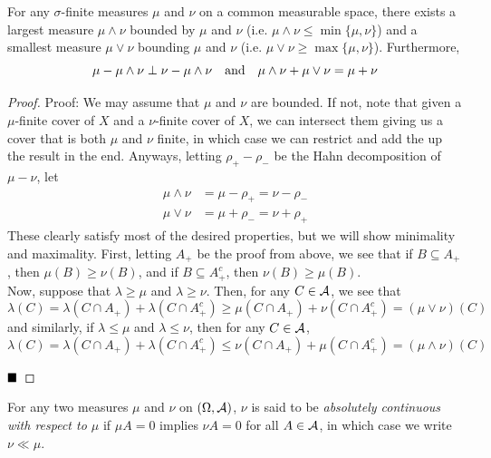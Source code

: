 \begin{lemma}
    For any $\sigma$-finite measures $\mu$ and $\nu$ on a common measurable space, there exists a largest measure $\mu \wedge \nu$ bounded by $\mu$ and $\nu$ (i.e. $\mu \wedge \nu \leq \min\{\mu, \nu\}$) and a smallest measure $\mu \vee \nu$ bounding $\mu$ and $\nu$ (i.e. $\mu \vee \nu \geq \max\{\mu, \nu\}$). Furthermore,
    \[ \mu - \mu \wedge \nu \perp \nu - \mu \wedge \nu \quand \mu \wedge \nu + \mu \vee \nu = \mu + \nu \]
\end{lemma}
\begin{proof}{Proof:}
    We may assume that $\mu$ and $\nu$ are bounded. If not, note that given a $\mu$-finite cover of $X$ and a $\nu$-finite cover of $X$, we can intersect them giving us a cover that is both $\mu$ and $\nu$ finite, in which case we can restrict and add the up the result in the end. Anyways, letting $\rho_{+} - \rho_{-}$ be the Hahn decomposition of $\mu - \nu$, let
    \begin{align*}
        \mu \wedge \nu &= \mu - \rho_{+} = \nu - \rho_{-}\\
        \mu \vee \nu &= \mu + \rho_{-} = \nu + \rho_{+}
    \end{align*}
    These clearly satisfy most of the desired properties, but we will show minimality and maximality. First, letting $A_+$ be the proof from above, we see that if $B \subseteq A_{+}$, then $\mu(B) \geq \nu(B)$, and if $B \subseteq A_{+}^{c}$, then $\nu(B) \geq \mu(B)$.\\

    Now, suppose that $\lambda \geq \mu$ and $\lambda \geq \nu$. Then, for any $C \in \cal{A}$, we see that
    \[ \lambda(C) = \lambda(C \cap A_{+}) + \lambda(C \cap A_{+}^{c}) \geq \mu(C \cap A_{+}) + \nu(C \cap A_{+}^{c}) = (\mu \vee \nu)(C) \]
    and similarly, if $\lambda \leq \mu$ and $\lambda \leq \nu$, then for any $C \in \cal{A}$, 
    \[ \lambda(C) = \lambda(C \cap A_{+}) + \lambda(C \cap A_{+}^{c}) \leq \nu(C \cap A_{+}) + \mu(C \cap A_{+}^{c}) = (\mu \wedge \nu)(C) \]

    $\qed$
\end{proof}

\begin{definition}
    For any two measures $\mu$ and $\nu$ on $(\Omega, \cal{A})$, $\nu$ is said to be \emph{absolutely continuous with respect to $\mu$} if $\mu A = 0$ implies $\nu A = 0$ for all $A \in \cal{A}$, in which case we write $\nu \ll \mu$.
\end{definition}

